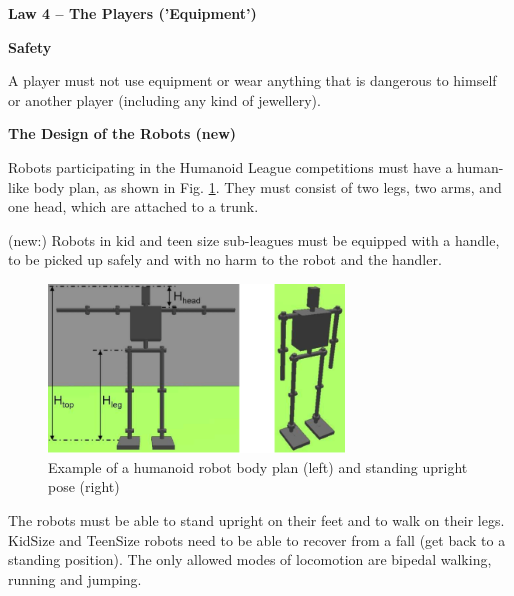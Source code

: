 \clearpage
\sffamily
{\bfseries\color[rgb]{0.4,0.4,0.4}
Law 4 -- The Players ('Equipment')}
{}

\bigskip

{\bfseries Safety }

\headlinebox

A player must not use equipment or wear anything that is dangerous to himself or another player (including any kind of jewellery).

\bigskip

{\bfseries The Design of the Robots (new)}

\headlinebox

Robots participating in the Humanoid League competitions must have a human-like body plan, as shown in Fig. \ref{fig:bodyplan}. They must consist of two legs, two arms, and one head, which are attached to a trunk.

\bigskip

(new:) Robots in kid and teen size sub-leagues must be equipped with a handle, to be picked up safely and with no harm to the robot and the handler.


\begin{figure}[h]
\begin{center}
\includegraphics[width=0.7\textwidth]{img/bodyplan.png}
\caption{Example of a humanoid robot body plan (left) and standing upright pose (right)}
\label{fig:bodyplan}
\vspace{-3ex}
\end{center}
\end{figure}


The robots must be able to stand upright on their feet and to walk on their legs. KidSize and TeenSize robots need to be able to recover from a fall (get back to a standing position). The only allowed modes of locomotion are bipedal walking, running and jumping.

\bigskip

